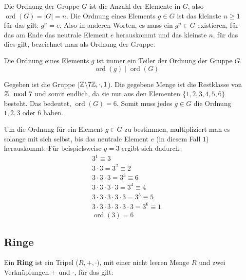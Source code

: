 \documentclass[11pt]{article}
\begin{document}
Die Ordnung der Gruppe $G$ ist die Anzahl der Elemente in $G$, also $\operatorname{ord}(G) = |G| = n$.
Die Ordnung eines Elements $g \in G$ ist das kleinste $n \ge 1$ für das gilt: $g^n=e$. Also in anderen Worten, es muss
ein $g^n\in G$ existieren, für das am Ende das neutrale Element $e$ herauskommt und das kleinste $n$, für das dies gilt,
bezeichnet man als Ordnung der Gruppe.

\begin{anmk}
  Die Ordnung eines Elements $g$ ist immer ein Teiler der Ordnung der Gruppe $G$.
  \[
    \operatorname{ord}(g) \mid \operatorname{ord}(G)
  \]
\end{anmk}
\begin{bsp}
  Gegeben ist die Gruppe ($\mathbb{Z}\backslash7\mathbb{Z}, \cdot, 1$). Die gegebene Menge ist die Restklasse von $\mathbb{Z} \mod 7$ und somit
  endlich, da sie nur aus den Elementen $\{1, 2, 3, 4, 5, 6\}$ besteht. Das bedeutet, $\operatorname{ord}(G) = 6$. Somit
  muss jedes $g \in G$ die Ordnung $1, 2, 3 \text{ oder } 6$ haben.

  Um die Ordnung für ein Element $g \in G$ zu bestimmen, multipliziert man es solange mit sich selbst, bis das neutrale
  Element $e$ (in diesem Fall $1$) herauskommt. Für beispielsweise $g = 3$ ergibt sich dadurch:
  \begin{align*}
    3^1 \equiv 3                                             \\
    3 \cdot 3 = 3^2 \equiv 2                                 \\
    3 \cdot 3 \cdot 3 = 3^3 \equiv 6                         \\
    3 \cdot 3 \cdot 3 \cdot 3 = 3^4 \equiv 4                 \\
    3 \cdot 3 \cdot 3 \cdot 3 \cdot 3 = 3^5 \equiv 5         \\
    3 \cdot 3 \cdot 3 \cdot 3 \cdot 3 \cdot 3 = 3^6 \equiv 1 \\
    \operatorname{ord}(3) = 6
  \end{align*}
\end{bsp}

\subsection{Ringe}
Ein \textbf{Ring} ist ein Tripel ($R, +, \cdot$), mit einer nicht leeren Menge $R$ und zwei Verknüpfungen $+$ und $\cdot$,
für das gilt:
\ul{
}
\end{document}
